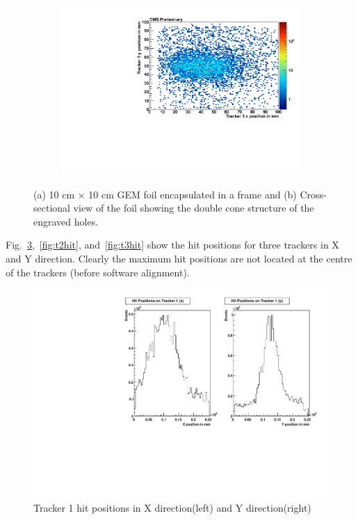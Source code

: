 \begin{figure}[!htbp]
\begin{subfigure}[b]{0.46\textwidth}
        \includegraphics[scale=0.35]{figures/GEM/profile_plots_for_Tracker3_Run1897.pdf}
        \caption{ }
        \label{fig:t3bp}
    \end{subfigure}
   \caption{(a) 10 cm $\times$ 10 cm GEM foil encapsulated in a frame and (b) Cross-sectional view of the foil showing the double cone structure of the engraved holes. } \label{fig:Foil_and_Cone}
\end{figure}
Fig.~\ref{fig:t1hit},~\ref{fig:t2hit}, and~\ref{fig:t3hit} show the hit positions for three trackers in X and Y direction. Clearly the maximum hit positions are not located at the centre of the trackers (before software alignment).
\begin{figure}[!htbp]
\centering
\includegraphics[width=5.1in]{figures/GEM/Tracker1_Hit_position_Run1897.pdf}
\caption{Tracker 1 hit positions in X direction(left) and Y direction(right)}\label{fig:t1hit}
\end{figure}

